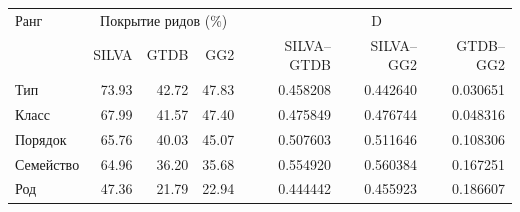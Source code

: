 \begin{tabular}{lrrrrrr}
\hline
Ранг & \multicolumn{3}{c}{Покрытие ридов (\%)} & \multicolumn{3}{c}{D} \\
 & SILVA & GTDB & GG2 & SILVA--GTDB & SILVA--GG2 & GTDB--GG2 \\
\hline
Тип & 73.93 & 42.72 & 47.83 & 0.458208 & 0.442640 & 0.030651 \\
Класс & 67.99 & 41.57 & 47.40 & 0.475849 & 0.476744 & 0.048316 \\
Порядок & 65.76 & 40.03 & 45.07 & 0.507603 & 0.511646 & 0.108306 \\
Семейство & 64.96 & 36.20 & 35.68 & 0.554920 & 0.560384 & 0.167251 \\
Род & 47.36 & 21.79 & 22.94 & 0.444442 & 0.455923 & 0.186607 \\
\hline
\end{tabular}

